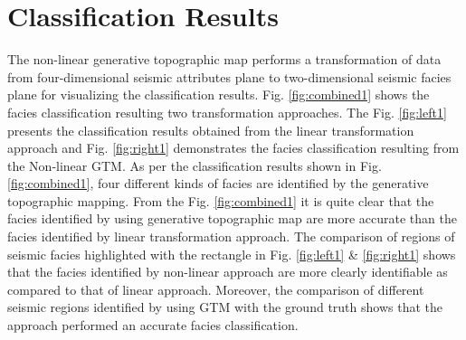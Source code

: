 \documentclass[a4paper]{article}
\begin{document}
\section{Classification Results}
The non-linear generative topographic map performs a transformation of data from four-dimensional seismic attributes plane to two-dimensional seismic facies plane for visualizing the classification results. Fig. \ref{fig:combined1} shows the facies classification resulting two transformation approaches. The Fig. \ref{fig:left1} presents the classification results obtained from the linear transformation approach\cite{fpca} and Fig. \ref{fig:right1} demonstrates the facies classification resulting from the Non-linear GTM.
As per the classification results shown in Fig. \ref{fig:combined1}, four different kinds of facies are identified by the generative topographic mapping. From the Fig. \ref{fig:combined1} it is quite clear that the facies identified by using generative topographic map are more accurate than the facies identified by linear transformation approach. The comparison of regions of seismic facies highlighted with the rectangle in Fig. \ref{fig:left1} \& \ref{fig:right1} shows that the facies identified by non-linear approach are more clearly identifiable as compared to that of linear approach. Moreover, the comparison of different seismic regions identified by using GTM with the ground truth\cite{gt} shows that the approach performed an accurate facies classification.
\end{document}
